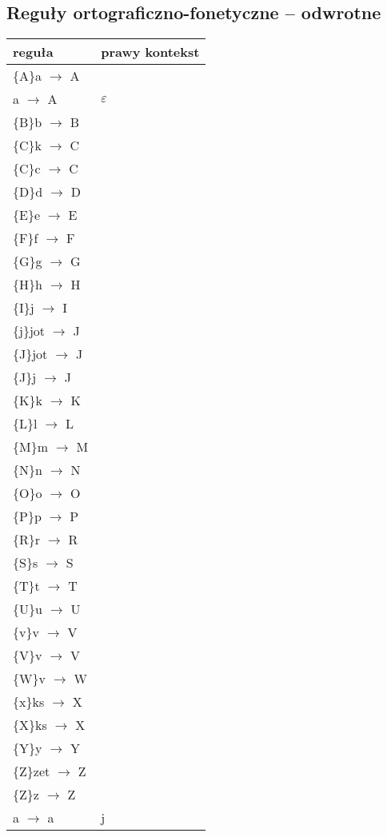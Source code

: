 \documentclass{article}
\begin{document}
\subsection{Reguły ortograficzno-fonetyczne -- odwrotne}
\begin{longtable}{l|p{10cm}}
reguła & prawy kontekst \\
\hline
\{A\}a $\rightarrow$ A & \\
a $\rightarrow$ A & $\varepsilon$\\
\{B\}b $\rightarrow$ B & \\
\{C\}k $\rightarrow$ C & \\
\{C\}c $\rightarrow$ C & \\
\{D\}d $\rightarrow$ D & \\
\{E\}e $\rightarrow$ E & \\
\{F\}f $\rightarrow$ F & \\
\{G\}g $\rightarrow$ G & \\
\{H\}h $\rightarrow$ H & \\
\{I\}j $\rightarrow$ I & \\
\{j\}jot $\rightarrow$ J & \\
\{J\}jot $\rightarrow$ J & \\
\{J\}j $\rightarrow$ J & \\
\{K\}k $\rightarrow$ K & \\
\{L\}l $\rightarrow$ L & \\
\{M\}m $\rightarrow$ M & \\
\{N\}n $\rightarrow$ N & \\
\{O\}o $\rightarrow$ O & \\
\{P\}p $\rightarrow$ P & \\
\{R\}r $\rightarrow$ R & \\
\{S\}s $\rightarrow$ S & \\
\{T\}t $\rightarrow$ T & \\
\{U\}u $\rightarrow$ U & \\
\{v\}v $\rightarrow$ V & \\
\{V\}v $\rightarrow$ V & \\
\{W\}v $\rightarrow$ W & \\
\{x\}ks $\rightarrow$ X & \\
\{X\}ks $\rightarrow$ X & \\
\{Y\}y $\rightarrow$ Y & \\
\{Z\}zet $\rightarrow$ Z & \\
\{Z\}z $\rightarrow$ Z & \\
a $\rightarrow$ a & j\\

\end{longtable}
\end{document}
